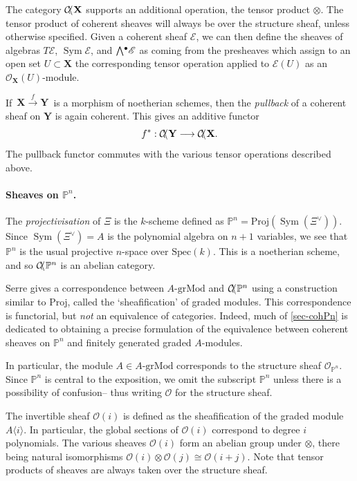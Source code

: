 \documentclass[a4paper]{article}
\theoremstyle{definition}
\theoremstyle{remark}
\newcommand{\Exter}{\mathchoice{{\textstyle\bigwedge}}%
    {{\bigwedge}}%
    {{\textstyle\wedge}}%
    {{\scriptstyle\wedge}}}
\newcommand{\grMod}{\ensuremath{\text{-grMod}}}
\DeclareMathOperator{\Sym}{\text{Sym}}
\newcommand{\Proj}{\ensuremath{\text{Proj}}}
\newcommand{\Pn}{\ensuremath{{\mathbb{P}^n}}}
\DeclareMathOperator{\coh}{\mathcal{C\kern -2pt o\kern -2pt h\kern -1pt}}
\begin{document}
The category \(\coh\mathbf{X}\) supports an additional operation, the tensor
product \(\otimes\). The tensor product of coherent sheaves will always be over
the structure sheaf, unless otherwise specified. Given a coherent sheaf
\(\mathscr{E}\), we can then define the sheaves of algebras \(T\mathscr{E}\),
\(\Sym \mathscr{E}\), and \(\Exter^\bullet \mathscr{E}\) as coming from
the presheaves which assign to an open set \(U\subset \mathbf{X}\) the
corresponding tensor operation applied to \(\mathscr{E}(U)\) as an
\(\mathscr{O}_\mathbf{X}(U)\)-module.

If \(\,\mathbf{X}\xrightarrow{\;f\;} \mathbf{Y}\,\) is a morphism of noetherian
schemes, then the \textit{pullback} of a coherent sheaf on \(\mathbf{Y}\)
is again coherent. This gives an additive functor \[f^\ast:
\coh\mathbf{Y}\longrightarrow \coh\mathbf{X}.\] 
The pullback functor commutes with the various tensor operations described above.

\paragraph{Sheaves on \Pn.} The \textit{projectivisation} of \(\Xi\) is the
\(k\)-scheme defined as \(\Pn = \Proj(\Sym (\Xi^\vee))\). Since
\(\Sym(\Xi^\vee)=A\) is the polynomial algebra on \(n+1\) variables, we see that
\(\Pn\) is the usual projective \(n\)-space over \(\text{Spec}(k)\). This is a
noetherian scheme, and so \(\coh\Pn\) is an abelian category.

Serre gives a correspondence between \(A\grMod\) and
\(\coh\Pn\) using a construction similar to \(\Proj\), called the
`sheafification' of graded modules. This correspondence is functorial, but
\textit{not} an equivalence of categories. Indeed, much of \cref{sec-cohPn} is
dedicated to obtaining a precise formulation of the equivalence between coherent
sheaves on \(\Pn\) and finitely generated graded \(A\)-modules.

In particular, the module \(A\in A\grMod\) corresponds to the structure sheaf
\(\mathscr{O}_\Pn\). Since \(\Pn\) is central to the exposition, we omit the
subscript \(\Pn\) unless there is a possibility of confusion-- thus writing
\(\mathscr{O}\) for the structure sheaf.

The invertible sheaf \(\mathscr{O}(i)\) is defined as the sheafification of
the graded module \(A\langle i \rangle\). In particular, the global sections of
\(\mathscr{O}(i)\) correspond to degree \(i\) polynomials. The various sheaves
\(\mathscr{O}(i)\) form an abelian group under \(\otimes\), there being natural
isomorphisms \(\mathscr{O}(i)\otimes \mathscr{O}(j)\cong \mathscr{O}(i+j).\)
Note that tensor products of sheaves are always taken over the structure
sheaf. 
\end{document}
